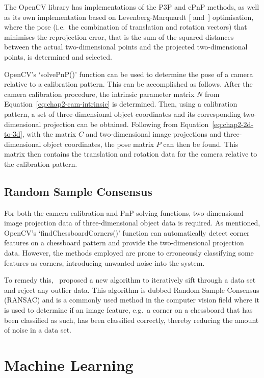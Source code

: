 The OpenCV library has implementations of the P3P and ePnP methods, as well as its own implementation based on Levenberg-Marquardt [\cite{levenberg1944method} and~\cite{marquardt1963algorithm}] optimisation, where the pose (i.e.\ the combination of translation and rotation vectors) that minimises the reprojection error, that is the sum of the squared distances between the actual two-dimensional points and the projected two-dimensional points, is determined and selected. 

OpenCV's `solvePnP()' function can be used to determine the pose of a camera relative to a calibration pattern. This can be accomplished as follows. After the camera calibration procedure, the intrinsic parameter matrix $N$ from Equation~\ref{eq:chap2-cam-intrinsic} is determined. Then, using a calibration pattern, a set of three-dimensional object coordinates and its corresponding two-dimensional projection can be obtained. Following from Equation~\ref{eq:chap2-2d-to-3d}, with the matrix $C$ and two-dimensional image projections and three-dimensional object coordinates, the pose matrix $P$ can then be found. This matrix then contains the translation and rotation data for the camera relative to the calibration pattern. 

\subsection{Random Sample Consensus}

For both the camera calibration and PnP solving functions, two-dimensional image projection data of three-dimensional object data is required. As mentioned, OpenCV's `findChessboardCorners()' function can automatically detect corner features on a chessboard pattern and provide the two-dimensional projection data. However, the methods employed are prone to erroneously classifying some features as corners, introducing unwanted noise into the system. 

To remedy this,~\cite{fischler1981random} proposed a new algorithm to iteratively sift through a data set and reject any outlier data. This algorithm is dubbed Random Sample Consensus (RANSAC) and is a commonly used method in the computer vision field where it is used to determine if an image feature, e.g.\ a corner on a chessboard that has been classified as such, has been classified correctly, thereby reducing the amount of noise in a data set. 

\section{Machine Learning}

